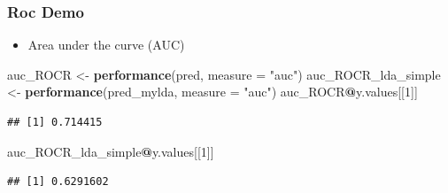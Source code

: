 \documentclass[
  shownotes,
  xcolor={svgnames},
  hyperref={colorlinks,citecolor=DarkBlue,linkcolor=DarkRed,urlcolor=DarkBlue}
  , aspectratio=169]{beamer}
\newenvironment{Shaded}{\begin{snugshade}}{\end{snugshade}}
\newcommand{\DataTypeTok}[1]{\textcolor[rgb]{0.13,0.29,0.53}{#1}}
\newcommand{\DecValTok}[1]{\textcolor[rgb]{0.00,0.00,0.81}{#1}}
\newcommand{\KeywordTok}[1]{\textcolor[rgb]{0.13,0.29,0.53}{\textbf{#1}}}
\newcommand{\NormalTok}[1]{#1}
\newcommand{\OperatorTok}[1]{\textcolor[rgb]{0.81,0.36,0.00}{\textbf{#1}}}
\newcommand{\StringTok}[1]{\textcolor[rgb]{0.31,0.60,0.02}{#1}}
\begin{document}
\begin{frame}[fragile]
\frametitle{Roc Demo}
\begin{itemize}
  \item Area under the curve (AUC)

\end{itemize}
\begin{scriptsize}
\begin{Shaded}
\begin{Highlighting}[]
\NormalTok{auc\_ROCR \textless{}{-}}\StringTok{ }\KeywordTok{performance}\NormalTok{(pred, }\DataTypeTok{measure =} \StringTok{"auc"}\NormalTok{)}
\NormalTok{auc\_ROCR\_lda\_simple \textless{}{-}}\StringTok{ }\KeywordTok{performance}\NormalTok{(pred\_mylda, }\DataTypeTok{measure =} \StringTok{"auc"}\NormalTok{)}
\NormalTok{auc\_ROCR}\OperatorTok{@}\NormalTok{y.values[[}\DecValTok{1}\NormalTok{]]}
\end{Highlighting}
\end{Shaded}

\begin{verbatim}
## [1] 0.714415
\end{verbatim}


\begin{Shaded}
\begin{Highlighting}[]
\NormalTok{auc\_ROCR\_lda\_simple}\OperatorTok{@}\NormalTok{y.values[[}\DecValTok{1}\NormalTok{]]}
\end{Highlighting}
\end{Shaded}


\begin{verbatim}
## [1] 0.6291602
\end{verbatim}
\end{scriptsize}

\end{frame}




\end{document}
